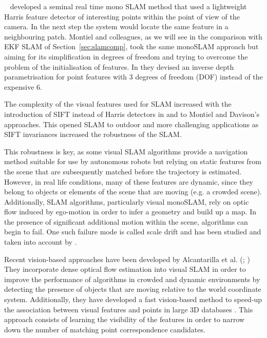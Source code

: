 
\citeauthor{davison2007monoslam}~\cite{davison2007monoslam} developed a seminal real time mono SLAM method that used a lightweight Harris feature detector of interesting points within the point of view of the camera. In the next step the system would locate the same feature in a neighbouring patch. Montiel and colleagues, as we will see in the comparison with EKF SLAM of Section~\ref{sec:slamcomp}, took the same monoSLAM approach but aiming for its simplification in degrees of freedom and trying to overcome the problem of the initialisation of features. In \citep{montiel2006unified} they devised an inverse depth parametrisation for point features with 3 degrees of freedom (DOF) instead of the expensive 6.

The complexity of the visual features used for SLAM increased with the introduction of SIFT instead of Harris detectors in \citep{chen2007sift} and \citep{suzuki2011development} to Montiel and Davison's approaches. This opened SLAM to outdoor and more challenging applications as SIFT invariances increased the robustness of the SLAM.

This robustness is key, as some visual SLAM algorithms provide a navigation method suitable for use by autonomous robots \citep{konolige2007frame} but relying on static features from the scene that are subsequently matched before the trajectory is estimated. However, in real life conditions, many of these features are dynamic, since they belong to objects or elements of the scene that are moving (e.g. a crowded scene). Additionally, SLAM algorithms, particularly visual monoSLAM, rely on optic flow induced by ego-motion in order to infer a geometry and build up a map. In the presence of significant additional motion within the scene, algorithms can begin to fail.  One such failure mode is called scale drift and has been studied and taken into account by \cite{strasdat2010scale}. 

Recent vision-based approaches have been developed by Alcantarilla et al. (\cite{alcantarilla2010visual}; \cite{alcantarilla2012combining}) They incorporate dense optical flow estimation into visual SLAM in order to improve the performance of algorithms in crowded and dynamic environments by detecting the presence of objects that are moving relative to the world coordinate system. Additionally, they have developed a fast vision-based method to speed-up the association between visual features and points in large 3D databases \citep{alcantarilla2010learning}. This approach consists of learning the visibility of the features in order to narrow down the number of matching point correspondence candidates.


